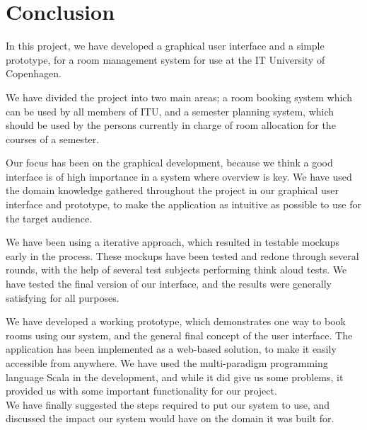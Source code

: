 \chapter{Conclusion}
In this project, we have developed a graphical user interface and a simple prototype, for a room management system for use at the IT University of Copenhagen.

We have divided the project into two main areas; a room booking system which can be used by all members of ITU, and a semester planning system, which should be used by the persons currently in charge of room allocation for the courses of a semester.

Our focus has been on the graphical development, because we think a good interface is of high importance in a system where overview is key. We have used the domain knowledge gathered throughout the project in our graphical user interface and prototype, to make the application as intuitive as possible to use for the target audience. 

We have been using a iterative approach, which resulted in testable mockups early in the process. These mockups have been tested and redone through several rounds, with the help of several test subjects performing think aloud tests. We have tested the final version of our interface, and the results were generally satisfying for all purposes.

We have developed a working prototype, which demonstrates one way to book rooms using our system, and the general final concept of the user interface. The application has been implemented as a web-based solution, to make it easily accessible from anywhere. We have used the multi-paradigm programming language Scala in the development, and while it did give us some problems, it provided us with some important functionality for our project.\\

We have finally suggested the steps required to put our system to use, and discussed the impact our system would have on the domain it was built for.